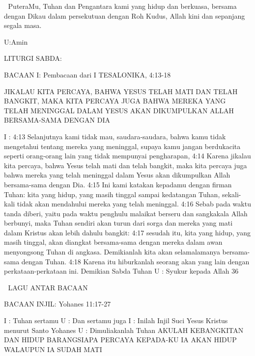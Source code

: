 \documentclass[10pt,a5paper,fancyhdr]{memoir}
\begin{document}

PuteraMu, Tuhan dan Pengantara kami yang hidup dan berkuasa, 
bersama dengan Dikau dalam persekutuan dengan Roh Kudus, Allah 
kini dan sepanjang segala masa. 

U:Amin 

LITURGI SABDA: 

BACAAN I: Pembacaan dari I TESALONIKA, 4:13-18 

JIKALAU KITA PERCAYA, BAHWA YESUS TELAH MATI 
DAN TELAH BANGKIT, MAKA KITA PERCAYA JUGA 
BAHWA MEREKA YANG TELAH MENINGGAL DALAM 
YESUS AKAN DIKUMPULKAN ALLAH BERSAMA-SAMA 
DENGAN DIA 

I : 4:13 Selanjutnya kami tidak mau, saudara-saudara, bahwa kamu 
tidak mengetahui tentang mereka yang meninggal, supaya kamu 
jangan berdukacita seperti orang-orang lain yang tidak mempunyai 
pengharapan, 4:14 Karena jikalau kita percaya, bahwa Yesus telah 
mati dan telah bangkit, maka kita percaya juga bahwa mereka yang 
telah meninggal dalam Yesus akan dikumpulkan Allah bersama-sama 
dengan Dia. 4:15 Ini kami katakan kepadamu dengan firman Tuhan: 
kita yang hidup, yang masih tinggal sampai kedatangan Tuhan, 
sekali-kali tidak akan mendahului mereka yang telah meninggal. 4:16 
Sebab pada waktu tanda diberi, yaitu pada waktu penghulu malaikat 
berseru dan sangkakala Allah berbunyi, maka Tuhan sendiri akan 
turun dari sorga dan mereka yang mati dalam Kristus akan lebih 
dahulu bangkit: 4:17 sesudah itu, kita yang hidup, yang masih 
tinggal, akan diangkat bersama-sama dengan mereka dalam awan 
menyongsong Tuhan di angkasa. Demikianlah kita akan selamalamanya 
bersama-sama dengan Tuhan. 4:18 Karena itu hiburkanlah 
seorang akan yang lain dengan perkataan-perkataan ini. Demikian 
Sabda Tuhan 
U : Syukur kepada Allah 
36 



LAGU ANTAR BACAAN 

BACAAN INJIL: Yohanes 11:17-27 

I : Tuhan sertamu 
U : Dan sertamu juga 
I : Inilah Injil Suci Yesus Kristus menurut Santo Yohanes 
U : Dimuliakanlah Tuhan 
AKULAH KEBANGKITAN DAN HIDUP BARANGSIAPA 
PERCAYA KEPADA-KU IA AKAN HIDUP WALAUPUN IA 
SUDAH MATI 
\end{document}
